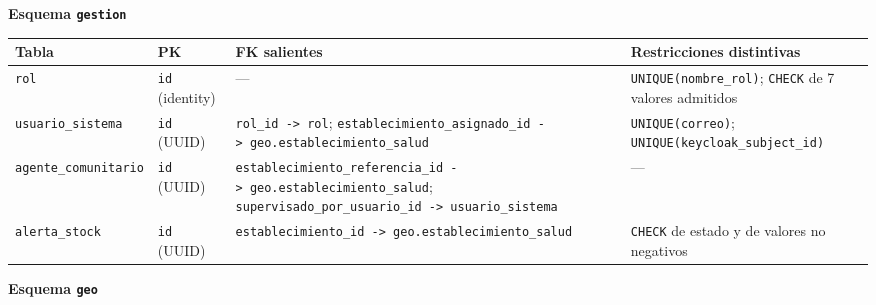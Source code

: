 \documentclass[11pt,a4paper]{article}
\begin{document}
\textbf{Esquema \texttt{gestion}}

{\small
\begin{longtable}[]{@{}
  >{\raggedright\arraybackslash}p{}
  >{\raggedright\arraybackslash}p{}
  >{\raggedright\arraybackslash}p{}
  >{\raggedright\arraybackslash}p{}@{}}
\toprule\noalign{}
\begin{minipage}[b]{\linewidth}\raggedright
Tabla
\end{minipage} & \begin{minipage}[b]{\linewidth}\raggedright
PK
\end{minipage} & \begin{minipage}[b]{\linewidth}\raggedright
FK salientes
\end{minipage} & \begin{minipage}[b]{\linewidth}\raggedright
Restricciones distintivas
\end{minipage} \\
\midrule\noalign{}
\endhead
\bottomrule\noalign{}
\endlastfoot
\texttt{rol} & \texttt{id} (identity) & --- & \texttt{UNIQUE(nombre\_rol)}; \texttt{CHECK} de 7 valores admitidos \\
\texttt{usuario\_sistema} & \texttt{id} (UUID) & \texttt{rol\_id\ -\textgreater{}\ rol}; \texttt{establecimiento\_asignado\_id\ -\textgreater{}\ geo.establecimiento\_salud} & \texttt{UNIQUE(correo)}; \texttt{UNIQUE(keycloak\_subject\_id)} \\
\texttt{agente\_comunitario} & \texttt{id} (UUID) & \texttt{establecimiento\_referencia\_id\ -\textgreater{}\ geo.establecimiento\_salud}; \texttt{supervisado\_por\_usuario\_id\ -\textgreater{}\ usuario\_sistema} & --- \\
\texttt{alerta\_stock} & \texttt{id} (UUID) & \texttt{establecimiento\_id\ -\textgreater{}\ geo.establecimiento\_salud} & \texttt{CHECK} de estado y de valores no negativos \\
\end{longtable}
}

\textbf{Esquema \texttt{geo}}
\end{document}

